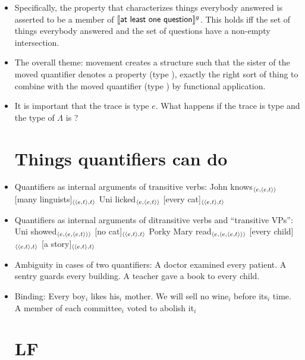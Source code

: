\begin{itemize}
\item Specifically, the property that characterizes things everybody answered is asserted to be a member of $\llbracket \textsf{at least one question} \rrbracket^g$. This holds iff the set of things everybody answered and the set of questions have a non-empty intersection.%

\item The overall theme: movement creates a structure such that the sister of the moved quantifier denotes a property (type ), exactly the right sort of thing to combine with the moved quantifier (type ) by functional application. %

\item It is important that the trace is type $e$. What happens if the trace is type  and the type of $\Lambda$ is ?%


\section{Things quantifiers can do}

\item Quantifiers as internal arguments of transitive verbs:
\bex
	\ex John knows$_{\langle e,\langle e,t \rangle \rangle}$ [many linguists]$_{\langle \langle e,t \rangle,t \rangle}$
	\ex Uni licked$_{\langle e,\langle e,t \rangle \rangle}$ [every cat]$_{\langle \langle e,t \rangle,t \rangle}$
\eex

\item Quantifiers as internal arguments of ditransitive verbs and ``transitive VPs'': %
\bex
	\ex Uni showed$_{\langle e,\langle e,\langle e,t \rangle \rangle \rangle}$ [no cat]$_{\langle \langle e,t \rangle,t \rangle}$ Porky
	\ex Mary read$_{\langle e,\langle e,\langle e,t \rangle \rangle \rangle}$ [every child]$_{\langle \langle e,t \rangle,t \rangle}$ [a story]$_{\langle \langle e,t \rangle,t \rangle}$%
\eex

\item Ambiguity in cases of two quantifiers: 
\bex
	\ex A doctor examined every patient. 
	\ex A sentry guards every building.
	\ex A teacher gave a book to every child. 
\eex

\item Binding:
\bex
	\ex Every boy$_i$ likes his$_i$ mother.
	\ex We will sell no wine$_i$ before its$_i$ time. 
	\ex A member of each committee$_i$ voted to abolish it$_i$
\eex


\section{LF}


\end{itemize}
